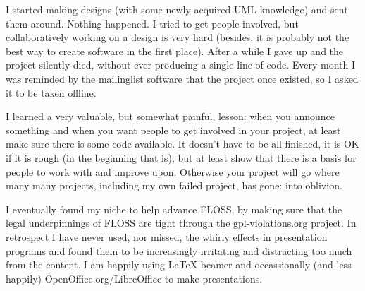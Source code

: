 I started making designs (with some newly acquired UML knowledge) and sent them
around. Nothing happened. I tried to get people involved, but collaboratively
working on a design is very hard (besides, it is probably not the best way to
create software in the first place). After a while I gave up and the project
silently died, without ever producing a single line of code. Every month I was
reminded by the mailinglist software that the project once existed, so I asked
it to be taken offline.

I learned a very valuable, but somewhat painful, lesson: when you announce
something and when you want people to get involved in your project, at least
make sure there is some code available. It doesn't have to be all finished, it
is OK if it is rough (in the beginning that is), but at least show that there is
a basis for people to work with and improve upon. Otherwise your project will go
where many many projects, including my own failed project, has gone: into
oblivion.

I eventually found my niche to help advance FLOSS, by making sure that the legal
underpinnings of FLOSS are tight through the gpl-violations.org project. In
retrospect I have never used, nor missed, the whirly effects in presentation
programs and found them to be increasingly irritating and distracting too much
from the content. I am happily using LaTeX beamer and occassionally (and less
happily) OpenOffice.org/LibreOffice to make presentations.